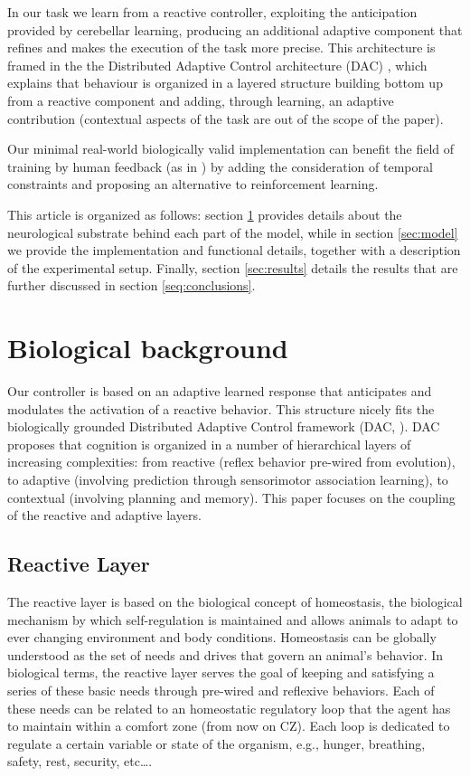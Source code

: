 \documentclass[letterpaper, 10 pt, conference]{ieeeconf}  %
\begin{document}
In our task we learn from a reactive controller, exploiting the anticipation provided by cerebellar learning, producing an additional adaptive component that refines and makes the execution of the task more precise. This architecture is framed in the the Distributed Adaptive Control architecture (DAC) \cite{verschure2003environmentally} , which explains that behaviour is organized in a layered structure building bottom up from a reactive component and adding, through learning, an adaptive contribution (contextual aspects of the task are out of the scope of the paper). 

Our minimal real-world biologically valid implementation can benefit the field of training by human feedback (as in \cite{knox2013training}) by adding the consideration of temporal constraints and proposing an alternative to reinforcement learning. 


This article is organized as follows: section \ref{sec:bio} provides details about the neurological substrate behind each part of the model, while in section \ref{sec:model} we provide the implementation and functional details, together with a description of the experimental setup. Finally, section \ref{sec:results} details the results that are further discussed in section \ref{seq:conclusions}. 


\section{Biological background}
\label{sec:bio}

Our controller is based on an adaptive learned response that anticipates and modulates the activation of a reactive behavior. 
This structure nicely fits the biologically grounded Distributed Adaptive Control framework (DAC, \cite{verschure2003environmentally,verschure2014why}). DAC proposes that cognition is organized in a number of hierarchical layers of increasing complexities: from reactive (reflex behavior pre-wired from evolution), to adaptive (involving prediction through sensorimotor association learning), to contextual (involving planning and memory). This paper focuses on the coupling of the reactive and adaptive layers. 

\subsection{Reactive Layer}
\label{sec:reactive_bio}

The reactive layer is based on the biological concept of homeostasis, the biological mechanism by which self-regulation is maintained and allows animals to adapt to ever changing environment and body conditions. Homeostasis can be globally understood as the set of needs and drives that govern an animal's behavior. In biological terms, the reactive layer serves the goal of keeping and satisfying a series of these basic needs through pre-wired and reflexive behaviors. Each of these needs can be related to an homeostatic regulatory loop that the agent has to maintain within a comfort zone (from now on CZ). Each loop is dedicated to regulate a certain variable or state of the organism, e.g., hunger, breathing, safety, rest, security, etc\ldots. 
\end{document}
